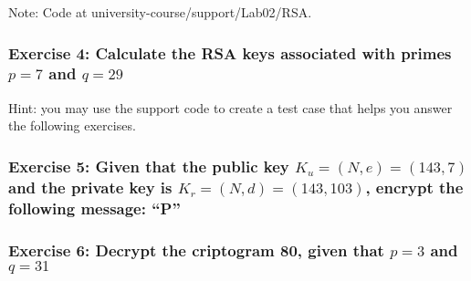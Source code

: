 \documentclass[12pt,a4paper]{article}
\theoremstyle{definition}
\begin{document}
Note: Code at university-course/support/Lab02/RSA.

\subsubsection*{Exercise 4: Calculate the RSA keys associated with primes $p = 7$ and $q = 29$}

Hint: you may use the support code to create a test case that helps you answer the following exercises.

\subsubsection*{Exercise 5: Given that the public key $K_u = (N,e) = (143, 7)$ and the private key is $K_r = (N,d) = (143, 103)$, encrypt the following message: ``P''}


\subsubsection*{Exercise 6: Decrypt the criptogram 80, given that $p = 3$ and $q = 31$ }







\end{document}
